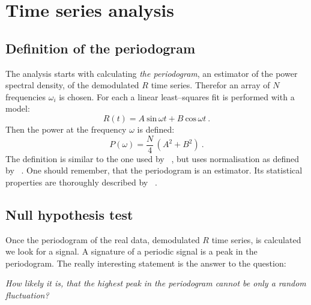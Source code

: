 %


\section{Time series analysis}
\subsection{Definition of the periodogram}
The analysis starts with calculating \emph{the periodogram}, an estimator of the power spectral density, of the demodulated $R$ time series. Therefor an array of $N$ frequencies $\omega_i$ is chosen. For each a linear least--squares fit is performed with a model:
\begin{equation}
  R(t) = A\ \mathrm{sin}\,\omega t + B\ \mathrm{cos}\,\omega t \ .
\end{equation}
Then the power at the frequency $\omega$ is defined:
\begin{equation}
  P(\omega) = \frac{N}{4} \, (A^2 + B^2)\ .
\end{equation}
The definition is similar to the one used by \citeauthor{VanTilburg2015}~\citep{VanTilburg2015}, but uses normalisation as defined by \citeauthor{Scargle1982}~\citep{Scargle1982}. One should remember, that the periodogram is an estimator. Its statistical properties are thoroughly described by \citeauthor{Scargle1982}~\citep{Scargle1982}.


\subsection{Null hypothesis test}
Once the periodogram of the real data, demodulated $R$ time series, is calculated we look for a signal. A signature of a periodic signal is a peak in the periodogram. The really interesting statement is the answer to the question:

\begin{center}
  \emph{How likely it is, that the highest peak in the periodogram cannot be only a random fluctuation?}
\end{center}

